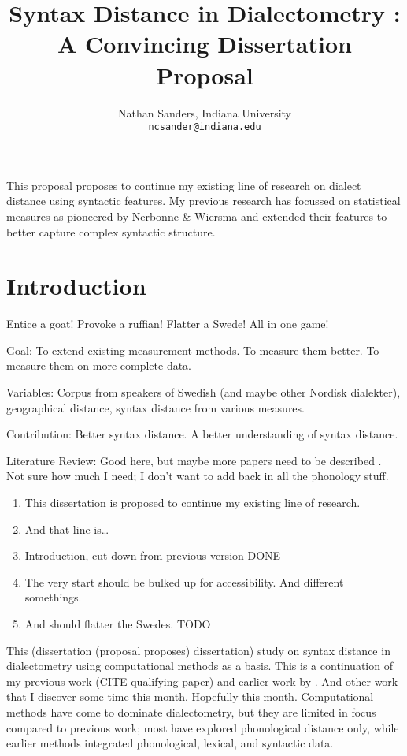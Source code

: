 \documentclass[11pt]{article}
\author{Nathan Sanders, Indiana University \\ \tt{ncsander@indiana.edu}}
\title{Syntax Distance in Dialectometry : A Convincing Dissertation
  Proposal}
\begin{document}
\maketitle

This proposal proposes to continue my existing line of research on
dialect distance using syntactic features. My previous research has
focussed on statistical measures as pioneered by Nerbonne \& Wiersma
and extended their features to better capture complex syntactic
structure.

\section{Introduction}

Entice a goat! Provoke a ruffian! Flatter a Swede! All in one game!

Goal: To extend existing measurement methods. To measure them
better. To measure them on more complete data.

Variables: Corpus from speakers of Swedish (and maybe other Nordisk
dialekter), geographical distance, syntax distance from various
measures.

Contribution: Better syntax distance. A better understanding of syntax
distance.

Literature Review: Good here, but maybe more papers need to be
described . Not sure how much I need; I don't want to add back in all
the phonology stuff.

\begin{enumerate}
\item This dissertation is proposed to continue my existing line of research.
\item And that line is\ldots
\item Introduction, cut down from previous version DONE
\item The very start should be bulked up for accessibility. And
  different somethings.
\item And should flatter the Swedes. TODO
\end{enumerate}

This (dissertation (proposal proposes) dissertation) study on syntax
distance in dialectometry using computational methods as a basis. This
is a continuation of my previous work (CITE qualifying paper) and
earlier work by . And other work that I discover
some time this month. Hopefully this month. Computational methods have
come to dominate dialectometry, but they are limited in focus compared
to previous work; most have explored phonological distance only, while
earlier methods integrated phonological, lexical, and syntactic data.
\end{document}
